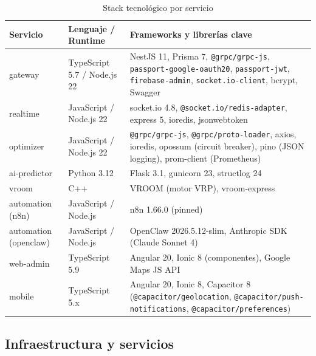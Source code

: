 \documentclass[12pt,a4paper,oneside]{article}
\begin{document}
\begin{table}[H]
\centering
\caption{Stack tecnol\'ogico por servicio}
\label{tab:stack}
\small
\begin{tabularx}{\textwidth}{p{3cm} p{3.5cm} X}
\toprule
\textbf{Servicio} & \textbf{Lenguaje / Runtime} & \textbf{Frameworks y librer\'ias clave} \\
\midrule
gateway & TypeScript 5.7 / Node.js 22 & NestJS 11, Prisma 7, \texttt{@grpc/grpc-js}, \texttt{passport-google-oauth20}, \texttt{passport-jwt}, \texttt{firebase-admin}, \texttt{socket.io-client}, bcrypt, Swagger \\
realtime & JavaScript / Node.js 22 & socket.io 4.8, \texttt{@socket.io/redis-adapter}, express 5, ioredis, jsonwebtoken \\
optimizer & JavaScript / Node.js 22 & \texttt{@grpc/grpc-js}, \texttt{@grpc/proto-loader}, axios, ioredis, opossum (circuit breaker), pino (JSON logging), prom-client (Prometheus) \\
ai-predictor & Python 3.12 & Flask 3.1, gunicorn 23, structlog 24 \\
vroom & C++ & VROOM (motor VRP), vroom-express \\
automation (n8n) & JavaScript / Node.js & n8n 1.66.0 (pinned) \\
automation (openclaw) & JavaScript / Node.js & OpenClaw 2026.5.12-slim, Anthropic SDK (Claude Sonnet 4) \\
\midrule
web-admin & TypeScript 5.9 & Angular 20, Ionic 8 (componentes), Google Maps JS API \\
mobile & TypeScript 5.x & Angular 20, Ionic 8, Capacitor 8 (\texttt{@capacitor/geolocation}, \texttt{@capacitor/push-notifications}, \texttt{@capacitor/preferences}) \\
\bottomrule
\end{tabularx}
\end{table}

\subsection{Infraestructura y servicios}
\end{document}
